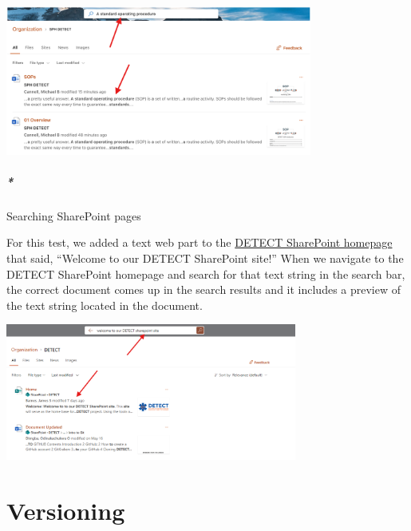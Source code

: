 \documentclass[
  letterpaper,
  DIV=11,
  numbers=noendperiod]{scrreprt}
\let\oldparagraph\paragraph
\renewcommand{\paragraph}[1]{\oldparagraph{#1}\mbox{}}
\begin{document}
\begin{center}
\includegraphics[width=3.97in,height=\textheight]{chapters/authoring_sops/../../graphics/sharepoint_detailed_list.png}
\end{center}

\paragraph*{Searching SharePoint
pages}\label{searching-sharepoint-pages}

For this test, we added a text web part to the
\href{https://uthtmc.sharepoint.com/sites/SPHDETECT-RPC/SitePages/Home.aspx}{DETECT
SharePoint homepage} that said, ``Welcome to our DETECT SharePoint
site!'' When we navigate to the DETECT SharePoint homepage and search
for that text string in the search bar, the correct document comes up in
the search results and it includes a preview of the text string located
in the document.

\begin{center}
\includegraphics[width=3.77in,height=\textheight]{chapters/authoring_sops/../../graphics/sharepoint_pages.png}
\end{center}

\chapter*{Versioning}\label{sec-versioning}

\end{document}
